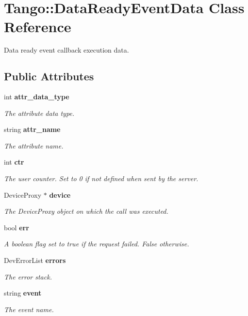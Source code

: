 \section{Tango\-:\-:Data\-Ready\-Event\-Data Class Reference}
\label{classTango_1_1DataReadyEventData}


Data ready event callback execution data.  


\subsection*{Public Attributes}
\begin{DoxyCompactItemize}
\item 
int {\bf attr\-\_\-data\-\_\-type}
\begin{DoxyCompactList}\small\item\em The attribute data type. \end{DoxyCompactList}\item 
string {\bf attr\-\_\-name}
\begin{DoxyCompactList}\small\item\em The attribute name. \end{DoxyCompactList}\item 
int {\bf ctr}
\begin{DoxyCompactList}\small\item\em The user counter. Set to 0 if not defined when sent by the server. \end{DoxyCompactList}\item 
Device\-Proxy $\ast$ {\bf device}
\begin{DoxyCompactList}\small\item\em The Device\-Proxy object on which the call was executed. \end{DoxyCompactList}\item 
bool {\bf err}
\begin{DoxyCompactList}\small\item\em A boolean flag set to true if the request failed. False otherwise. \end{DoxyCompactList}\item 
Dev\-Error\-List {\bf errors}
\begin{DoxyCompactList}\small\item\em The error stack. \end{DoxyCompactList}\item 
string {\bf event}
\begin{DoxyCompactList}\small\item\em The event name. \end{DoxyCompactList}\end{DoxyCompactItemize}


